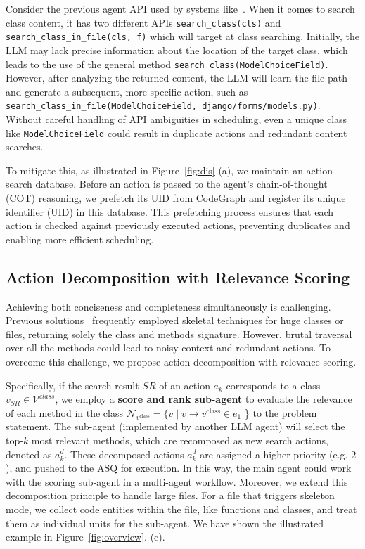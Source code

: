 Consider the previous agent API used by systems like~\cite{zhang2024autocoderover,ma2024understand}. When it comes to search class content, it has two different APIs \texttt{search\_class(cls)} and \texttt{search\_class\_in\_file(cls, f)} which will target at class searching. Initially, the LLM may lack precise information about the location of the target class, which leads to the use of the general method \texttt{search\_class(ModelChoiceField)}. However, after analyzing the returned content, the LLM will learn the file path and generate a subsequent, more specific action, such as \texttt{search\_class\_in\_file(ModelChoiceField, django/forms/models.py)}. Without careful handling of API ambiguities in scheduling, even a unique class like \texttt{ModelChoiceField} could result in duplicate actions and redundant content searches. 

To mitigate this, as illustrated in Figure~\ref{fig:dis} (a), we maintain an action search database. Before an action is passed to the agent’s chain-of-thought (COT) reasoning, we prefetch its UID from CodeGraph and register its unique identifier (UID) in this database. This prefetching process ensures that each action is checked against previously executed actions, preventing duplicates and enabling more efficient scheduling. 




\subsection{Action Decomposition with Relevance Scoring}
\label{score ranking}
Achieving both conciseness and completeness simultaneously is challenging. Previous solutions~\cite{xia2024agentless, autocoderover} frequently employed skeletal techniques for huge classes or files, returning solely the class and methods signature. However, brutal traversal over all the methods could lead to noisy context and redundant actions. 
To overcome this challenge, we propose action decomposition with relevance scoring.  

Specifically, if the search result $SR$ of an action $a_k$ corresponds to a class $v_{SR}\in \mathcal{V}^{class}$, we employ a \textbf{score and rank sub-agent} to evaluate the relevance of each method in the class $\mathcal{N}_{v^{\text{class}}} = \{ v \mid v \to v^{\text{class}} \in e_1$ \} to the problem statement. The sub-agent (implemented by another LLM agent) will select the top-$k$ most relevant methods, which are recomposed as new search actions, denoted as $a_k^d$. These decomposed actions $a_k^d$ are assigned a higher priority (e.g. $2$), and pushed to the ASQ for execution. In this way, the main agent could work with the scoring sub-agent in a multi-agent workflow. Moreover, we extend this decomposition principle to handle large files. For a file that triggers skeleton mode, we collect code entities within the file, like functions and classes, and treat them as individual units for the sub-agent. We have shown the illustrated example in Figure~\ref{fig:overview}. (c). 

